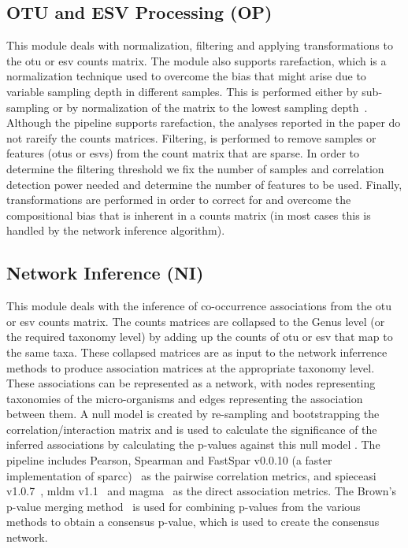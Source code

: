   \subsection*{OTU and ESV Processing (OP)}
  \vspace{-5mm}
  This module deals with normalization, filtering and applying transformations to the \ac{otu} or \ac{esv} counts matrix.
  The module also supports rarefaction, which is a normalization technique used to overcome the bias that might arise due to variable sampling depth in different samples.
  This is performed either by sub-sampling or by normalization of the matrix to the lowest sampling depth~\cite{Weiss2015}.
  Although the pipeline supports rarefaction, the analyses reported in the paper do not rareify the counts matrices.
  Filtering, is performed to remove samples or features (\ac{otu}s or \ac{esv}s) from the count matrix that are sparse.
  In order to determine the filtering threshold we fix the number of samples and correlation detection power needed and determine the number of features to be used.
  Finally, transformations are performed in order to correct for and overcome the compositional bias that is inherent in a counts matrix (in most cases this is handled by the network inference algorithm).

  \subsection*{Network Inference (NI)}
  \vspace{-5mm}
  This module deals with the inference of co-occurrence associations from the \ac{otu} or \ac{esv} counts matrix.
  The counts matrices are collapsed to the Genus level (or the required taxonomy level) by adding up the counts of \ac{otu} or \ac{esv} that map to the same taxa.
  These collapsed matrices are as input to the network inferrence methods to produce association matrices at the appropriate taxonomy level.
  These associations can be represented as a network, with nodes representing taxonomies of the micro-organisms and edges representing the association between them.
  A null model is created by re-sampling and bootstrapping the correlation/interaction matrix and is used to calculate the significance of the inferred associations by calculating the p-values against this null model \cite{Watts2018}.
  The pipeline includes Pearson, Spearman and FastSpar v0.0.10 (a faster implementation of \ac{sparcc})~\cite{Watts2018} as the pairwise correlation metrics, and \ac{spieceasi} v1.0.7~\cite{Kurtz2015}, \ac{mldm} v1.1~\cite{Yang2017} and \ac{magma}~\cite{Cougoul2019} as the direct association metrics.
  The Brown's p-value merging method~\cite{brown_400_1975} is used for combining p-values from the various methods to obtain a consensus p-value, which is used to create the consensus network.

